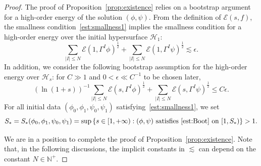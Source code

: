 \documentclass[a4paper,reqno]{amsart}
\theoremstyle{definition}
\numberwithin{equation}{section}
\begin{document}
\begin{proof}
 The proof of Proposition~\ref{prop:existence} relies on a bootstrap argument for a high-order energy of the solution $(\phi,\psi)$. From the definition of $\mathcal{E}(s,f)$, the smallness condition~\eqref{est:smallness1} implies the smallness condition for a high-order energy over the initial hypersurface $\mathcal{H}_{1}$:
\begin{equation}\label{est:smallness}
     \sum_{|I|\le N}\mathcal{E}(1,\Gamma^{I}\phi)^{\frac{1}{2}}+\sum_{|I|\le N}\mathcal{E}(1,\Gamma^{I}\psi)^{\frac{1}{2}}
     \lesssim \epsilon.
\end{equation}
In addition, we consider the following bootstrap assumption for the high-order energy over $\mathcal{H}_{s}$: for $C\gg 1$ and $0<\epsilon\ll C^{-1}$ to be chosen later, 
 \begin{equation}\label{est:Boot}
     (\ln(1+s))^{-1}\sum_{|I|\le N}\mathcal{E}(s,\Gamma^{I}\phi)^{\frac{1}{2}}+\sum_{|I|\le N}\mathcal{E}(s,\Gamma^{I}\psi)^{\frac{1}{2}}
     \leq C\epsilon.
 \end{equation}
 For all initial data $(\phi_{0},\phi_1,\psi_{0},\psi_1)$ satisfying~\eqref{est:smallness1}, we set 
\begin{equation*}
S_{*}=S_{*}(\phi_{0},\phi_1,\psi_{0},\psi_1)=\sup \left\{s\in [1,+\infty):(\phi,\psi) \ \mbox{satisfies}~\eqref{est:Boot}\ \mbox{on}\ [1,S_{*})\right\}>1.
\end{equation*}

We are in a position to complete the proof of 
Proposition~\ref{prop:existence}. Note that, in the following discussions, the implicit constants in $\lesssim$ can depend on the constant $N\in \mathbb{N}^{+}$.


\end{proof}
\end{document}
